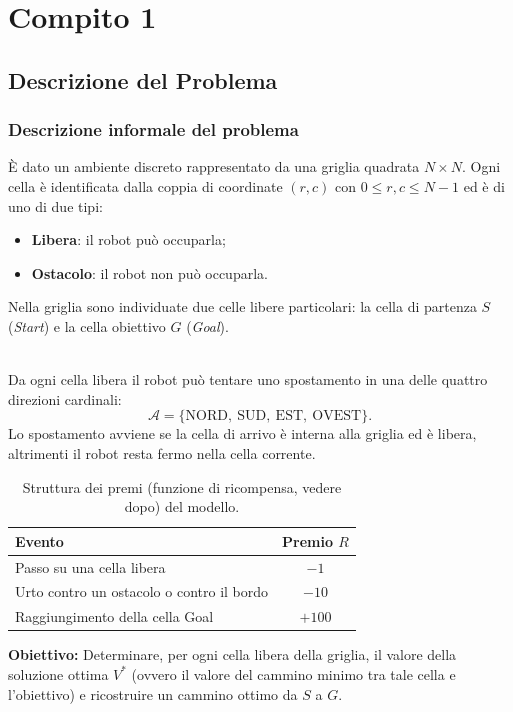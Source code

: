 \section{Compito 1}

\subsection{Descrizione del Problema}
\subsubsection{Descrizione informale del problema}
È dato un ambiente discreto rappresentato da una griglia quadrata $N \times N$.
Ogni cella è identificata dalla coppia di coordinate $(r, c)$ con $0 \le r, c \le N-1$ ed è di uno di due tipi:
\begin{itemize}
    \item \textbf{Libera}: il robot può occuparla;
    \item \textbf{Ostacolo}: il robot non può occuparla.
\end{itemize}

\noindent
Nella griglia sono individuate due celle libere particolari: la cella di partenza $S$ (\textit{Start}) e la cella obiettivo $G$ (\textit{Goal}).

\noindent\\
Da ogni cella libera il robot può tentare uno spostamento in una delle quattro direzioni cardinali:
\[
\mathcal{A} = \{\text{NORD},\ \text{SUD},\ \text{EST},\ \text{OVEST}\}.
\]
Lo spostamento avviene se la cella di arrivo è interna alla griglia ed è libera, altrimenti il robot resta fermo nella cella corrente.

\begin{table}[H]
\centering
\begin{tabular}{lc}
\hline
\textbf{Evento} & \textbf{Premio $R$} \\
\hline
Passo su una cella libera & $-1$ \\
Urto contro un ostacolo o contro il bordo & $-10$ \\
Raggiungimento della cella Goal & $+100$ \\
\hline
\end{tabular}
\caption{Struttura dei premi (funzione di ricompensa, vedere dopo) del modello.}
\end{table}

\noindent
\textbf{Obiettivo:} Determinare, per ogni cella libera della griglia, il valore della soluzione ottima $V^*$ (ovvero il valore del cammino minimo tra tale cella e l'obiettivo) e ricostruire un cammino ottimo da $S$ a $G$.

